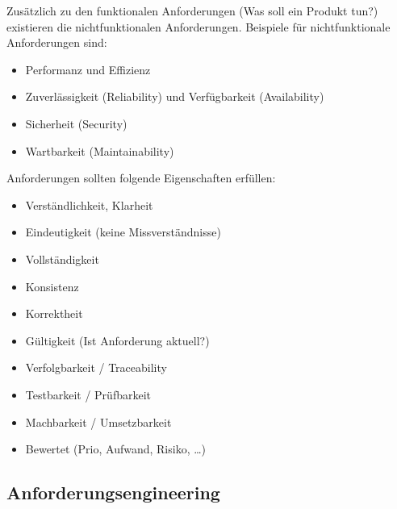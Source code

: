 Zusätzlich zu den funktionalen Anforderungen (Was soll ein Produkt tun?) existieren die nichtfunktionalen Anforderungen. Beispiele für nichtfunktionale Anforderungen sind:
\begin{itemize}
	\item Performanz und Effizienz
	\item Zuverlässigkeit (Reliability) und Verfügbarkeit (Availability)
	\item Sicherheit (Security)
	\item Wartbarkeit (Maintainability)
\end{itemize}
Anforderungen sollten folgende Eigenschaften erfüllen:
\begin{itemize}
	\item Verständlichkeit, Klarheit
	\item Eindeutigkeit (keine Missverständnisse)
	\item Vollständigkeit
	\item Konsistenz
	\item Korrektheit
	\item Gültigkeit (Ist Anforderung aktuell?)
	\item Verfolgbarkeit / Traceability
	\item Testbarkeit / Prüfbarkeit
	\item Machbarkeit / Umsetzbarkeit
	\item Bewertet (Prio, Aufwand, Risiko, …)
\end{itemize}

\subsection{Anforderungsengineering}

